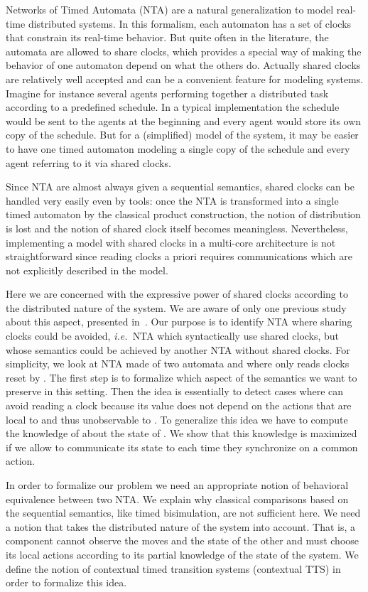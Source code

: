 \documentclass{LMCS}
\theoremstyle{plain}\newtheorem*{prop11}{Proposition~\ref{prop:states} bis}
\def\ie{{\em i.e.\ }}
\begin{document}
Networks of Timed Automata (NTA) are a natural generalization to model real-time
distributed systems. In this formalism, each automaton has a set of clocks that
constrain its real-time behavior. But quite often in the literature, the
automata are allowed to share clocks, which provides a special way of making the
behavior of one automaton depend on what the others do. Actually shared clocks
are relatively well accepted and can be a convenient feature for modeling
systems. Imagine for instance several agents performing together a distributed
task according to a predefined schedule. In a typical implementation the
schedule would be sent to the agents at the beginning and every agent would
store its own copy of the schedule. But for a (simplified) model of the system,
it may be easier to have one timed automaton modeling a single copy of the
schedule and every agent referring to it via shared clocks.

Since NTA are almost always given a sequential semantics,
shared clocks can be handled very easily even by tools: once the NTA is
transformed into a single timed automaton by the classical product construction,
the notion of distribution is lost and the notion of shared clock itself becomes
meaningless. Nevertheless, implementing a model with shared clocks in a
multi-core architecture is not straightforward since reading clocks a priori
requires communications which are not explicitly described in the model.

Here we are concerned with the expressive power of shared clocks according to
the distributed nature of the system. We are aware of only one previous study
about this aspect, presented in~\cite{LPW07}.
Our purpose is to identify NTA where sharing clocks could be avoided,  \ie NTA
which syntactically use shared clocks, but whose semantics could be achieved by
another NTA without shared clocks. For simplicity, we look at NTA made of two
automata  and  where only  reads clocks reset by .
The first step is to formalize which aspect of the semantics we want to preserve
in this setting. Then the idea is essentially to detect cases where  can
avoid reading a clock because its value does not depend on the actions that are
local to  and thus unobservable to . To generalize this idea we
have to compute the knowledge of  about the state of . We show
that this knowledge is maximized if we allow  to communicate its state to
 each time they synchronize on a common action.

In order to formalize our problem we need an appropriate notion of behavioral
equivalence between two NTA\@. We explain why classical comparisons based on the
sequential semantics, like timed bisimulation, are not sufficient here.
We need a notion that takes the distributed nature of the system into account.
That is, a component cannot observe the moves and the state of the other and
must choose its local actions according to its partial knowledge of the state of
the system. We define the notion of contextual timed transition systems
(contextual TTS) in order to formalize this idea.
\end{document}
